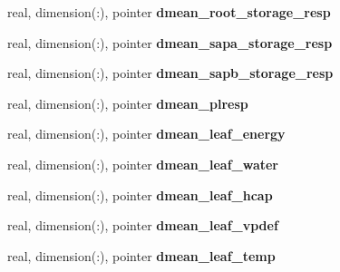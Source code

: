 \begin{DoxyCompactItemize}
\item 
\hypertarget{structed__state__vars_1_1edtype_a5255bc6b6362c27140ed98c3a2fa1810}{
real, dimension(:), pointer {\bfseries dmean\_\-root\_\-storage\_\-resp}}
\label{structed__state__vars_1_1edtype_a5255bc6b6362c27140ed98c3a2fa1810}

\item 
\hypertarget{structed__state__vars_1_1edtype_a46662f85e39680c05d938cab5438ed79}{
real, dimension(:), pointer {\bfseries dmean\_\-sapa\_\-storage\_\-resp}}
\label{structed__state__vars_1_1edtype_a46662f85e39680c05d938cab5438ed79}

\item 
\hypertarget{structed__state__vars_1_1edtype_a07d302d586b30cf5252725de48f7d6b8}{
real, dimension(:), pointer {\bfseries dmean\_\-sapb\_\-storage\_\-resp}}
\label{structed__state__vars_1_1edtype_a07d302d586b30cf5252725de48f7d6b8}

\item 
\hypertarget{structed__state__vars_1_1edtype_a8772151b05fa8bdec8e4dfb5249edd82}{
real, dimension(:), pointer {\bfseries dmean\_\-plresp}}
\label{structed__state__vars_1_1edtype_a8772151b05fa8bdec8e4dfb5249edd82}

\item 
\hypertarget{structed__state__vars_1_1edtype_a91f58e02b66d62aa0dd02e1fc21d17ee}{
real, dimension(:), pointer {\bfseries dmean\_\-leaf\_\-energy}}
\label{structed__state__vars_1_1edtype_a91f58e02b66d62aa0dd02e1fc21d17ee}

\item 
\hypertarget{structed__state__vars_1_1edtype_af54182eed345197ab67e8b131e0df833}{
real, dimension(:), pointer {\bfseries dmean\_\-leaf\_\-water}}
\label{structed__state__vars_1_1edtype_af54182eed345197ab67e8b131e0df833}

\item 
\hypertarget{structed__state__vars_1_1edtype_a363f7d5776c8910396624c88d1302207}{
real, dimension(:), pointer {\bfseries dmean\_\-leaf\_\-hcap}}
\label{structed__state__vars_1_1edtype_a363f7d5776c8910396624c88d1302207}

\item 
\hypertarget{structed__state__vars_1_1edtype_adfbdd7e98b099e6c24dc3beffc31c8fe}{
real, dimension(:), pointer {\bfseries dmean\_\-leaf\_\-vpdef}}
\label{structed__state__vars_1_1edtype_adfbdd7e98b099e6c24dc3beffc31c8fe}

\item 
\hypertarget{structed__state__vars_1_1edtype_af4e90c4b4c0e6cf5ffa07f76f34da94e}{
real, dimension(:), pointer {\bfseries dmean\_\-leaf\_\-temp}}
\label{structed__state__vars_1_1edtype_af4e90c4b4c0e6cf5ffa07f76f34da94e}


\end{DoxyCompactItemize}
